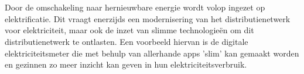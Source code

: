 
%
%
%
%
%

%



\chapter*{}

Door de omschakeling naar hernieuwbare energie wordt volop ingezet op elektrificatie. Dit vraagt enerzijds een modernisering van het distributienetwerk voor elektriciteit, maar ook de inzet van slimme technologieën om dit distributienetwerk te ontlasten. Een voorbeeld hiervan is de digitale elektriciteitsmeter die met behulp van allerhande apps 'slim' kan gemaakt worden en gezinnen zo meer inzicht kan geven in hun elektriciteitsverbruik. \\

